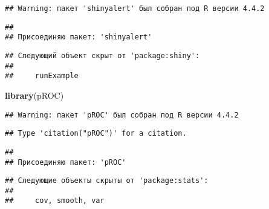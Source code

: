 \documentclass[
]{article}
\newenvironment{Shaded}{\begin{snugshade}}{\end{snugshade}}
\newcommand{\FunctionTok}[1]{\textcolor[rgb]{0.13,0.29,0.53}{\textbf{#1}}}
\newcommand{\NormalTok}[1]{#1}
\begin{document}
\begin{verbatim}
## Warning: пакет 'shinyalert' был собран под R версии 4.4.2
\end{verbatim}

\begin{verbatim}
## 
## Присоединяю пакет: 'shinyalert'
\end{verbatim}

\begin{verbatim}
## Следующий объект скрыт от 'package:shiny':
## 
##     runExample
\end{verbatim}

\begin{Shaded}
\begin{Highlighting}[]
\FunctionTok{library}\NormalTok{(pROC)}
\end{Highlighting}
\end{Shaded}

\begin{verbatim}
## Warning: пакет 'pROC' был собран под R версии 4.4.2
\end{verbatim}

\begin{verbatim}
## Type 'citation("pROC")' for a citation.
\end{verbatim}

\begin{verbatim}
## 
## Присоединяю пакет: 'pROC'
\end{verbatim}

\begin{verbatim}
## Следующие объекты скрыты от 'package:stats':
## 
##     cov, smooth, var
\end{verbatim}
\end{document}
